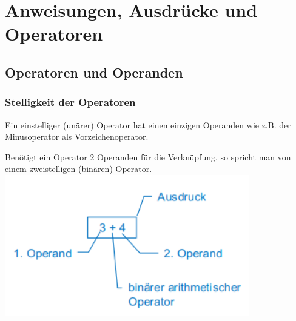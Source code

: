 \section{Anweisungen, Ausdrücke und Operatoren}
	\begin{minipage}[t]{8 cm}
		\subsection{Operatoren und Operanden}
			\subsubsection{Stelligkeit der Operatoren}
				\begin{compactitem}
				 	\item Ein einstelliger (unärer) Operator hat einen einzigen Operanden wie z.B. der Minusoperator als Vorzeichenoperator.
				 	\item Benötigt ein Operator 2 Operanden für die Verknüpfung, so spricht man von einem zweistelligen (binären) Operator.\\ 
				 	\includegraphics[width=0.8\textwidth]{pics/binaerer_Operator.png}
				\end{compactitem}
	\end{minipage}
	\hspace*{1cm}		
